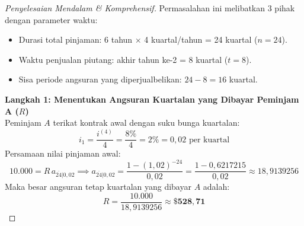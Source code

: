 \documentclass[11pt,a4paper]{article}
\begin{document}
\begin{proof}[Penyelesaian Mendalam \& Komprehensif]
Permasalahan ini melibatkan 3 pihak dengan parameter waktu:
\begin{itemize}
    \item Durasi total pinjaman: 6 tahun $\times$ 4 kuartal/tahun = 24 kuartal ($n = 24$).
    \item Waktu penjualan piutang: akhir tahun ke-2 = 8 kuartal ($t = 8$).
    \item Sisa periode angsuran yang diperjualbelikan: $24 - 8 = 16$ kuartal.
\end{itemize}

\begin{center}
\end{center}

\noindent\textbf{Langkah 1: Menentukan Angsuran Kuartalan yang Dibayar Peminjam A ($R$)}\\[0.3em]
Peminjam $A$ terikat kontrak awal dengan suku bunga kuartalan:
\begin{equation*}
    i_1 = \frac{i^{(4)}}{4} = \frac{8\%}{4} = 2\% = 0{,}02 \text{ per kuartal}
\end{equation*}
Persamaan nilai pinjaman awal:
\begin{equation*}
    10.000 = R \, a_{\overline{24}|0{,}02} \implies a_{\overline{24}|0{,}02} = \frac{1 - (1{,}02)^{-24}}{0{,}02} = \frac{1 - 0{,}6217215}{0{,}02} \approx 18{,}9139256
\end{equation*}
Maka besar angsuran tetap kuartalan yang dibayar $A$ adalah:
\begin{equation*}
    R = \frac{10.000}{18{,}9139256} \approx \mathbf{\$528{,}71}
\end{equation*}


\end{proof}
\end{document}
